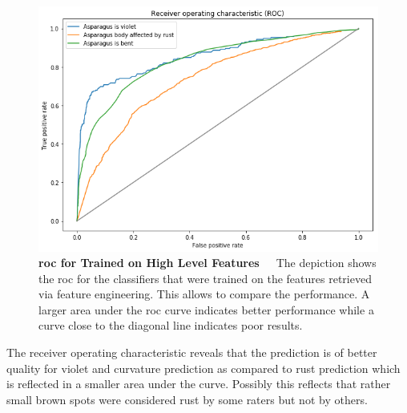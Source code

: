 \begin{figure}[!htb]
	\centering
	\includegraphics[scale=0.6]{Figures/chapter04/fe_roc.png}
	\caption[Feature Engineering ROC Curve]{\textbf{\acrshort{roc} for  Trained on High Level Features}~~~The depiction shows the \acrfull{roc} for the classifiers that were trained on the features retrieved via feature engineering. This allows to compare the performance. A larger area under the \acrshort{roc} curve indicates better performance while a curve close to the diagonal line indicates poor results.}
	\label{fig:FeatureEngineeringROC}
\end{figure}

The receiver operating characteristic reveals that the prediction is of better quality for violet and curvature prediction as compared to rust prediction which is reflected in a smaller area under the curve. Possibly this reflects that rather small brown spots were considered rust by some raters but not by others. 

